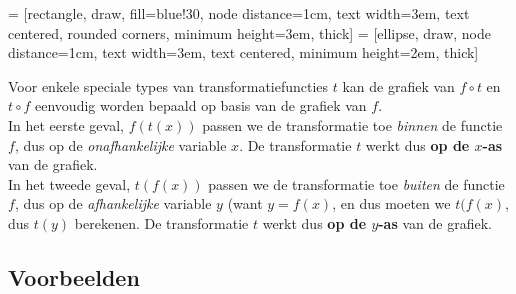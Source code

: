 \documentclass{ximera}
\begin{document}
\begin{center}
 = [rectangle, draw, fill=blue!30, node distance=1cm, text width=3em, text centered, rounded corners, minimum height=3em, thick]
 = [ellipse, draw, node distance=1cm, text width=3em, text centered, minimum height=2em, thick]
	
\end{center}

Voor enkele speciale types van transformatiefuncties $t$ kan de grafiek van $f\circ t$ en $t\circ f$ eenvoudig worden bepaald op basis van de grafiek van $f$.
\\

In het eerste geval, $f(t(x))$ passen we de transformatie toe \textit{binnen} de functie $f$, dus op de \textit{onafhankelijke} variable $x$. De transformatie  $t$ werkt dus \textbf{op de $x$-as} van de grafiek.
\\

In het tweede geval, $t(f(x))$ passen we de transformatie toe \textit{buiten} de functie $f$, dus op de \textit{afhankelijke} variable $y$ (want $y=f(x)$, en dus moeten we  $t(f(x)$, dus $t(y)$ berekenen. De transformatie $t$ werkt dus \textbf{op de $y$-as} van de grafiek.

\subsection{Voorbeelden}
\end{document}
